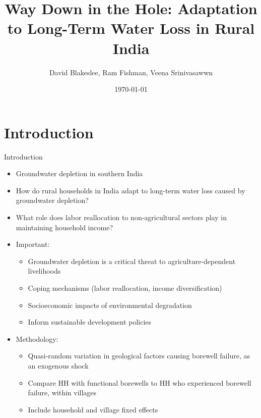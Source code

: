 \documentclass[10pt]{beamer}
\title[]{Way Down in the Hole: Adaptation to Long-Term Water Loss in Rural India}
\author[]{David Blakeslee, Ram Fishman, Veena Srinivasawwn}
\date{\today}
\begin{document}

\begin{frame}[plain]
\end{frame}


\section{Introduction}
\begin{frame}
	{Introduction}
	\begin{itemize}
		\item Groundwater depletion in southern India %
		\item How do rural households in India adapt to long-term water loss caused by groundwater depletion?
		\item What role does labor reallocation to non-agricultural sectors play in maintaining household income?
		\item Important:
		      \begin{itemize}
			      \item Groundwater depletion is a critical threat to agriculture-dependent livelihoods
			      \item Coping mechanisms (labor reallocation, income diversification) \item Socioeconomic impacts of environmental degradation
			      \item Inform sustainable development policies
		      \end{itemize}

		\item Methodology:
		      \begin{itemize}
			      \item Quasi-random variation in geological factors causing borewell failure, as an exogenous shock
			      \item Compare HH with functional borewells to HH who experienced borewell failure, within villages
			      \item Include household and village fixed effects
		      \end{itemize}
	\end{itemize}
\end{frame}
\end{document}

